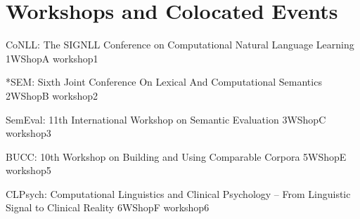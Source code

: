 \chapter[Workshops and Colocated Events: \daydate]{Workshops and Colocated Events}
\thispagestyle{emptyheader}
\vfill






\begin{wsschedule}
  {CoNLL: The SIGNLL Conference on Computational Natural Language Learning}
  {1}{WShopA}
  {workshop1}
  {\WShopLocA}
  
\end{wsschedule}

\begin{wsschedule}
  {*SEM: Sixth Joint Conference On Lexical And Computational Semantics}
  {2}{WShopB}
  {workshop2}
  {\WShopLocB}
  
\end{wsschedule}

\begin{wsschedule}
  {SemEval: 11th International Workshop on Semantic Evaluation}
  {3}{WShopC}
  {workshop3}
  {\WShopLocC}
  
\end{wsschedule}


\begin{wsschedule}
  {BUCC: 10th Workshop on Building and Using Comparable Corpora}
  {5}{WShopE}
  {workshop5}
  {\WShopLocE}
  
\end{wsschedule}

\begin{wsschedule}
  {CLPsych: Computational Linguistics and Clinical Psychology – From Linguistic Signal to Clinical Reality}
  {6}{WShopF}
  {workshop6}
  {\WShopLocF}
  
\end{wsschedule}

